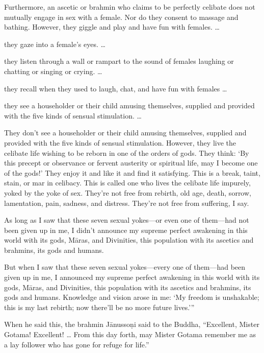 \documentclass[12pt,openany]{book}%
\begin{document}
Furthermore, an ascetic or brahmin who claims to be perfectly celibate does not mutually engage in sex with a female. Nor do they consent to massage and bathing. However, they giggle and play and have fun with females. … 

they gaze into a female’s eyes. … 

they listen through a wall or rampart to the sound of females laughing or chatting or singing or crying. … 

they recall when they used to laugh, chat, and have fun with females … 

they see a householder or their child amusing themselves, supplied and provided with the five kinds of sensual stimulation. … 

They don’t see a householder or their child amusing themselves, supplied and provided with the five kinds of sensual stimulation. However, they live the celibate life wishing to be reborn in one of the orders of gods. They think: ‘By this precept or observance or fervent austerity or spiritual life, may I become one of the gods!’ They enjoy it and like it and find it satisfying. This is a break, taint, stain, or mar in celibacy. This is called one who lives the celibate life impurely, yoked by the yoke of sex. They’re not free from rebirth, old age, death, sorrow, lamentation, pain, sadness, and distress. They’re not free from suffering, I say. 

As long as I saw that these seven sexual yokes—or even one of them—had not been given up in me, I didn’t announce my supreme perfect awakening in this world with its gods, \textsanskrit{Māras}, and Divinities, this population with its ascetics and brahmins, its gods and humans. 

But when I saw that these seven sexual yokes—every one of them—had been given up in me, I announced my supreme perfect awakening in this world with its gods, \textsanskrit{Māras}, and Divinities, this population with its ascetics and brahmins, its gods and humans. Knowledge and vision arose in me: ‘My freedom is unshakable; this is my last rebirth; now there’ll be no more future lives.’” 

When he said this, the brahmin \textsanskrit{Jānussoṇi} said to the Buddha, “Excellent, Mister Gotama! Excellent! … From this day forth, may Mister Gotama remember me as a lay follower who has gone for refuge for life.” 
\end{document}
